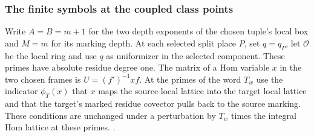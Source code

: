 \subsubsection{The finite symbols at the coupled class points}

Write \(A=B=m+1\) for the two depth exponents of the chosen
tuple's local box and \(M=m\) for its marking depth.
At each selected split place \(P\), set \(q=q_P\), let
\(\mathcal O\) be the local ring and use \(q\) as uniformizer
in the selected component. These primes have absolute
residue degree one. The matrix of a Hom variable \(x\) in the
two chosen frames is \(U=(f')^{-1}xf\).
At the primes of the word \(T_w\) use the indicator
\(\phi_T(x)\) that \(x\) maps the source local lattice into the
target local lattice and that the target's marked
residue covector pulls back to the source marking.
These conditions are unchanged under a perturbation by
\(T_w\) times the integral Hom lattice at these primes.
.

